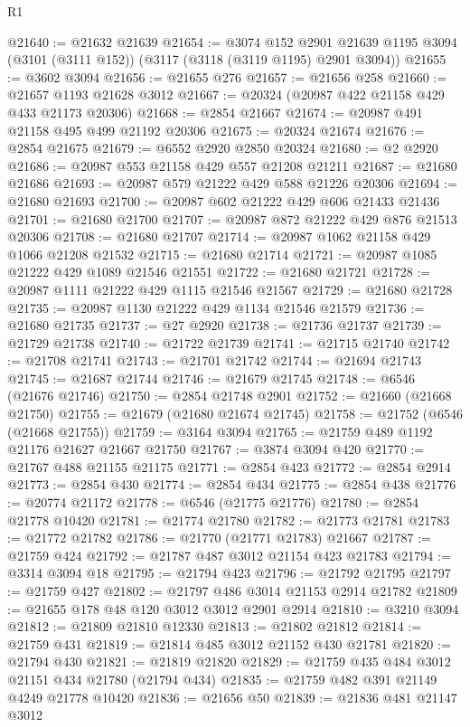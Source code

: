 \begin{lexlean}{R1}
\begin{coremodule}
@21640 := @21632 @21639
@21654 := @3074
    @152
    @2901
    @21639
    @1195
    @3094
    (@3101 (@3111 @152))
    (@3117 (@3118 (@3119 @1195) @2901 @3094))
@21655 := @3602 @3094
@21656 := @21655 @276
@21657 := @21656 @258
@21660 := @21657 @1193 @21628 @3012
@21667 := @20324 (@20987 @422 @21158 @429 @433 @21173 @20306)
@21668 := @2854 @21667
@21674 := @20987 @491 @21158 @495 @499 @21192 @20306
@21675 := @20324 @21674
@21676 := @2854 @21675
@21679 := @6552 @2920 @2850 @20324
@21680 := @2 @2920
@21686 := @20987 @553 @21158 @429 @557 @21208 @21211
@21687 := @21680 @21686
@21693 := @20987 @579 @21222 @429 @588 @21226 @20306
@21694 := @21680 @21693
@21700 := @20987 @602 @21222 @429 @606 @21433 @21436
@21701 := @21680 @21700
@21707 := @20987 @872 @21222 @429 @876 @21513 @20306
@21708 := @21680 @21707
@21714 := @20987 @1062 @21158 @429 @1066 @21208 @21532
@21715 := @21680 @21714
@21721 := @20987 @1085 @21222 @429 @1089 @21546 @21551
@21722 := @21680 @21721
@21728 := @20987 @1111 @21222 @429 @1115 @21546 @21567
@21729 := @21680 @21728
@21735 := @20987 @1130 @21222 @429 @1134 @21546 @21579
@21736 := @21680 @21735
@21737 := @27 @2920
@21738 := @21736 @21737
@21739 := @21729 @21738
@21740 := @21722 @21739
@21741 := @21715 @21740
@21742 := @21708 @21741
@21743 := @21701 @21742
@21744 := @21694 @21743
@21745 := @21687 @21744
@21746 := @21679 @21745
@21748 := @6546 (@21676 @21746)
@21750 := @2854 @21748 @2901
@21752 := @21660 (@21668 @21750)
@21755 := @21679 (@21680 @21674 @21745)
@21758 := @21752 (@6546 (@21668 @21755))
@21759 := @3164 @3094
@21765 := @21759 @489 @1192 @21176 @21627 @21667 @21750
@21767 := @3874 @3094 @420
@21770 := @21767 @488 @21155 @21175
@21771 := @2854 @423
@21772 := @2854 @2914
@21773 := @2854 @430
@21774 := @2854 @434
@21775 := @2854 @438
@21776 := @20774 @21172
@21778 := @6546 (@21775 @21776)
@21780 := @2854 @21778 @10420
@21781 := @21774 @21780
@21782 := @21773 @21781
@21783 := @21772 @21782
@21786 := @21770 (@21771 @21783) @21667
@21787 := @21759 @424
@21792 := @21787 @487 @3012 @21154 @423 @21783
@21794 := @3314 @3094 @18
@21795 := @21794 @423
@21796 := @21792 @21795
@21797 := @21759 @427
@21802 := @21797 @486 @3014 @21153 @2914 @21782
@21809 := @21655 @178 @48 @120 @3012 @3012 @2901 @2914
@21810 := @3210 @3094
@21812 := @21809 @21810 @12330
@21813 := @21802 @21812
@21814 := @21759 @431
@21819 := @21814 @485 @3012 @21152 @430 @21781
@21820 := @21794 @430
@21821 := @21819 @21820
@21829 := @21759 @435 @484 @3012 @21151 @434 @21780 (@21794 @434)
@21835 := @21759 @482 @391 @21149 @4249 @21778 @10420
@21836 := @21656 @50
@21839 := @21836 @481 @21147 @3012

\end{coremodule}
\end{lexlean}

